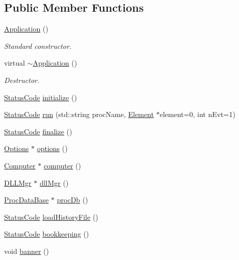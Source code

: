 \subsection*{Public Member Functions}
\begin{DoxyCompactItemize}
\item 
\hyperlink{classApplication_afa8cc05ce6b6092be5ecdfdae44e05f8}{Application} ()
\begin{DoxyCompactList}\small\item\em Standard constructor. \end{DoxyCompactList}\item 
virtual \hyperlink{classApplication_a748bca84fefb9c12661cfaa2f623748d}{$\sim$\+Application} ()
\begin{DoxyCompactList}\small\item\em Destructor. \end{DoxyCompactList}\item 
\hyperlink{classStatusCode}{Status\+Code} \hyperlink{classApplication_a86b8cbb104f3e04516ef574e5822ff82}{initialize} ()
\item 
\hyperlink{classStatusCode}{Status\+Code} \hyperlink{classApplication_a7fdd5bfee44e49896292f8964037384d}{run} (std\+::string proc\+Name, \hyperlink{classElement}{Element} $\ast$element=0, int n\+Evt=1)
\item 
\hyperlink{classStatusCode}{Status\+Code} \hyperlink{classApplication_a5e2b592eebe6f2f8780d2c129bf14560}{finalize} ()
\item 
\hyperlink{classOptions}{Options} $\ast$ \hyperlink{classApplication_ada7cc0e8db586985f1435aee0c79f47d}{options} ()
\item 
\hyperlink{classComputer}{Computer} $\ast$ \hyperlink{classApplication_ac5eb8a8e693d1b93426d7aabc6606d8b}{computer} ()
\item 
\hyperlink{classDLLMgr}{D\+L\+L\+Mgr} $\ast$ \hyperlink{classApplication_a0133c161bf55544f268ca039e174060b}{dll\+Mgr} ()
\item 
\hyperlink{classProcDataBase}{Proc\+Data\+Base} $\ast$ \hyperlink{classApplication_aa5c28af1a7e1c41dada2db2a4d03c57d}{proc\+Db} ()
\item 
\hyperlink{classStatusCode}{Status\+Code} \hyperlink{classApplication_ab5d46fc4784a4c821e974f5a47ec933d}{load\+History\+File} ()
\item 
\hyperlink{classStatusCode}{Status\+Code} \hyperlink{classApplication_ad5faa0fa744706190844bbc4be58b700}{bookkeeping} ()
\item 
void \hyperlink{classApplication_af168aa3579262d65adc0bd4531361a53}{banner} ()

\end{DoxyCompactItemize}
